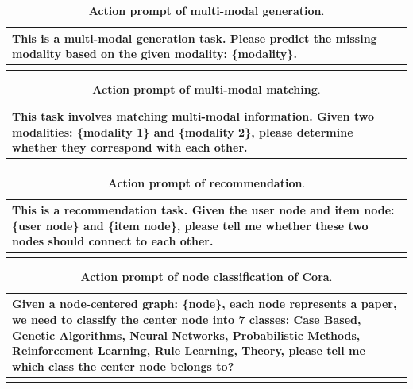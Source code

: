 \begin{table}[h]
\centering
\caption{\textbf{Action prompt of multi-modal generation}.}
\begin{tabular}{p{13cm}}
\toprule[1.1pt]
    This is a multi-modal generation task. Please predict the missing modality based on the given modality: \{modality\}.\\
\bottomrule[1.1pt]
\label{prompt-template:multi-modal generation}
\end{tabular}
\end{table}



\begin{table}[h]
\centering
\caption{\textbf{Action prompt of multi-modal matching}.}
\begin{tabular}{p{13cm}}
\toprule[1.1pt]
    This task involves matching multi-modal information. Given two modalities: \{modality 1\} and \{modality 2\}, please determine whether they correspond with each other. \\
\bottomrule[1.1pt]
\label{prompt-template:multi-modal matching}
\end{tabular}
\end{table}




\begin{table}[h]
\centering
\caption{\textbf{Action prompt of recommendation}.}
\begin{tabular}{p{13cm}}
\toprule[1.1pt]
    This is a recommendation task. Given the user node and item node: \{user node\} and \{item node\}, please tell me whether these two nodes should connect to each other.\\
\bottomrule[1.1pt]
\label{prompt-template:recommendation}
\end{tabular}
\end{table}


\begin{table}[h]
\centering
\caption{\textbf{Action prompt of node classification of Cora}.}
\begin{tabular}{p{13cm}}
\toprule[1.1pt]
    Given a node-centered graph: \{node\}, each node represents a paper, we need to classify the center node into 7 classes: Case Based, Genetic Algorithms, Neural Networks, Probabilistic Methods, Reinforcement Learning, Rule Learning, Theory, please tell me which class the center node belongs to?\\
\bottomrule[1.1pt]
\label{prompt-template:Cora_node}
\end{tabular}
\end{table}

